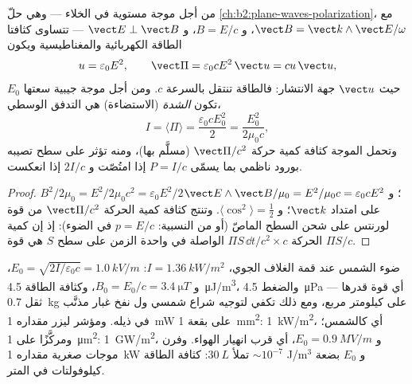 \begin{proposition}\label{prop:b2:poynting-vector:wave}
من أجل موجة مستوية في الخلاء --- وهي حلّ \cref{ch:b2:plane-waves-polarization}،
مع $\vect B = \vect k\wedge\vect E/\omega$، و $B = E/c$، و $\vect E \perp \vect B$ ---
تتساوى كثافتا الطاقة الكهربائية والمغناطيسية ويكون
\[
u = \varepsilon_0E^2 , \qquad \vect\Pi = \varepsilon_0cE^2\,\vect u = cu\,\vect u ,
\]
حيث $\vect u$ جهة الانتشار: فالطاقة تنتقل بالسرعة $c$.
ومن أجل موجة جيبية سعتها $E_0$ تكون \emph{الشدة}
(الاستضاءة) هي التدفق الوسطي،
\[
I = \langle\Pi\rangle = \frac{\varepsilon_0cE_0^2}2 = \frac{E_0^2}{2\mu_0c} ,
\]
وتحمل الموجة كثافة كمية حركة $\vect\Pi/c^2$ (مسلَّم بها)، ومنه
تؤثر على سطح تصيبه بورود ناظمي بما يسمّى \emph{} $P = I/c$ إذا امتُصّت و $2I/c$ إذا انعكست.
\end{proposition}

\begin{proof}
$B^2/2\mu_0 = E^2/2\mu_0c^2 = \varepsilon_0E^2/2$؛ و $\vect E\wedge\vect B/\mu_0 = E^2/\mu_0c =
\varepsilon_0cE^2$ على امتداد $\vect k$؛ و $\langle\cos^2\rangle = \tfrac12$. وتنتج كثافة
كمية الحركة $\vect\Pi/c^2$ من قوة لورنتس على شحن
السطح الماصّ (أو من النسبية: $p = E/c$ في الضوء): إذ إن
كمية الحركة $\Pi S\,\dd t/c^2\times c$ الواصلة في واحدة الزمن على سطح $S$ هي
قوة $\Pi S/c$.
\end{proof}

\begin{example}\label{ex:b2:poynting-vector:orders}
ضوء الشمس عند قمة الغلاف الجوي، $I = \qty{1.36}{kW/m^2}$: $E_0 =
\sqrt{2I/\varepsilon_0c} = \qty{1.0}{kV/m}$، و $B_0 = E_0/c = \qty{3.4}{\micro T}$، وكثافة
الطاقة \qty{4.5}{\micro J/m^3}، والضغط \qty{4.5}{\micro Pa} --- أي قوة قدرها ثقل \qty{0.7}{kg}
على كيلومتر مربع، ومع ذلك تكفي لتوجيه شراع شمسي ول
نفخ غبار مذنَّب في ذيله. ومؤشر ليزر مقداره \qty{1}{mW} على
بقعة \qty{1}{mm^2}: \qty{1}{kW/m^2}، أي كالشمس؛ ومركَّزًا على \qty{1}{\micro m^2}:
\qty{1}{GW/m^2}، و $E_0 = \qty{0.9}{MV/m}$، أي قرب انهيار الهواء. وفرن
موجات صغرية مقداره \qty{1}{kW}  تملأ $\qty{30}{L}$: كثافة
الطاقة $\sim 10^{-7}$ J/m$^3$ و $E_0$ بضعة كيلوفولتات في المتر.
\end{example}

